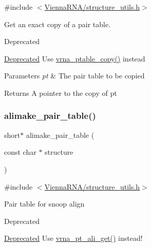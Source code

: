 {\ttfamily \#include $<$\hyperlink{structure__utils_8h}{Vienna\+R\+N\+A/structure\+\_\+utils.\+h}$>$}



Get an exact copy of a pair table. 

\begin{DoxyRefDesc}{Deprecated}
\item[\hyperlink{deprecated__deprecated000140}{Deprecated}]Use \hyperlink{group__struct__utils_ga2daefbbd6d9f8803731651882f54332d}{vrna\+\_\+ptable\+\_\+copy()} instead\end{DoxyRefDesc}



\begin{DoxyParams}{Parameters}
{\em pt} & The pair table to be copied \\
\hline
\end{DoxyParams}
\begin{DoxyReturn}{Returns}
A pointer to the copy of \textquotesingle{}pt\textquotesingle{} 
\end{DoxyReturn}
\mbox{\label{group__struct__utils_ga3c81b3967056c3888b8472b65fbb16f5}} 
\subsubsection{\texorpdfstring{alimake\+\_\+pair\+\_\+table()}{alimake\_pair\_table()}}
{\footnotesize\ttfamily short$\ast$ alimake\+\_\+pair\+\_\+table (\begin{DoxyParamCaption}\item[{const char $\ast$}]{structure }\end{DoxyParamCaption})}



{\ttfamily \#include $<$\hyperlink{structure__utils_8h}{Vienna\+R\+N\+A/structure\+\_\+utils.\+h}$>$}

Pair table for snoop align

\begin{DoxyRefDesc}{Deprecated}
\item[\hyperlink{deprecated__deprecated000141}{Deprecated}]Use \hyperlink{group__struct__utils_ga1ee4cdcda1f57d32dcb38032116d335d}{vrna\+\_\+pt\+\_\+ali\+\_\+get()} instead! \end{DoxyRefDesc}
\mbox{\label{group__struct__utils_ga9aa3bf3b4346bb7fb88efc154dd07a79}} 
